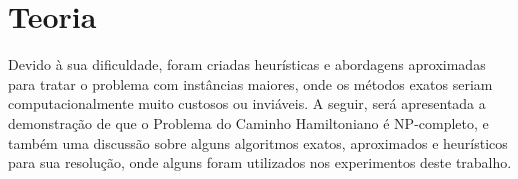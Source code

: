\section{Teoria}



Devido à sua dificuldade, foram criadas heurísticas e abordagens aproximadas para tratar o problema com instâncias maiores, onde os métodos exatos seriam computacionalmente muito custosos ou inviáveis. A seguir, será apresentada a demonstração de que o Problema do Caminho Hamiltoniano é NP-completo, e também uma discussão sobre alguns algoritmos exatos, aproximados e heurísticos para sua resolução, onde alguns foram utilizados nos experimentos deste trabalho.

%
